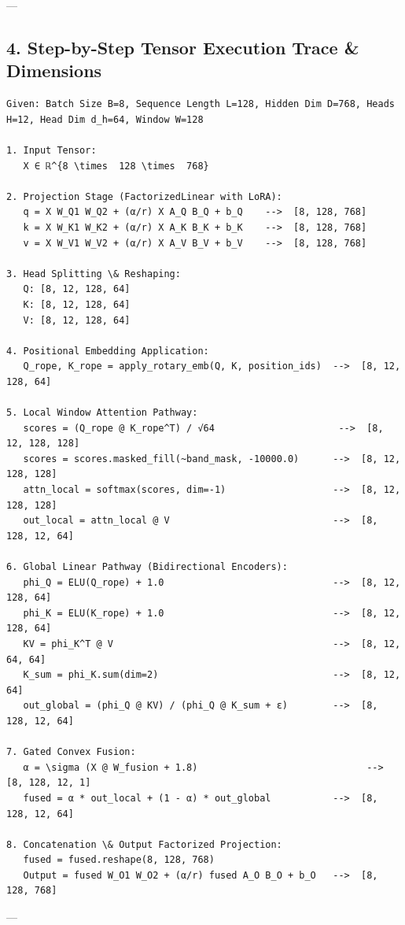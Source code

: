 ---



\subsection{4. Step-by-Step Tensor Execution Trace \& Dimensions}

\begin{lstlisting}
Given: Batch Size B=8, Sequence Length L=128, Hidden Dim D=768, Heads H=12, Head Dim d_h=64, Window W=128

1. Input Tensor:
   X ∈ ℝ^{8 \times  128 \times  768}

2. Projection Stage (FactorizedLinear with LoRA):
   q = X W_Q1 W_Q2 + (α/r) X A_Q B_Q + b_Q    -->  [8, 128, 768]
   k = X W_K1 W_K2 + (α/r) X A_K B_K + b_K    -->  [8, 128, 768]
   v = X W_V1 W_V2 + (α/r) X A_V B_V + b_V    -->  [8, 128, 768]

3. Head Splitting \& Reshaping:
   Q: [8, 12, 128, 64]
   K: [8, 12, 128, 64]
   V: [8, 12, 128, 64]

4. Positional Embedding Application:
   Q_rope, K_rope = apply_rotary_emb(Q, K, position_ids)  -->  [8, 12, 128, 64]

5. Local Window Attention Pathway:
   scores = (Q_rope @ K_rope^T) / √64                      -->  [8, 12, 128, 128]
   scores = scores.masked_fill(~band_mask, -10000.0)      -->  [8, 12, 128, 128]
   attn_local = softmax(scores, dim=-1)                   -->  [8, 12, 128, 128]
   out_local = attn_local @ V                             -->  [8, 128, 12, 64]

6. Global Linear Pathway (Bidirectional Encoders):
   phi_Q = ELU(Q_rope) + 1.0                              -->  [8, 12, 128, 64]
   phi_K = ELU(K_rope) + 1.0                              -->  [8, 12, 128, 64]
   KV = phi_K^T @ V                                       -->  [8, 12, 64, 64]
   K_sum = phi_K.sum(dim=2)                               -->  [8, 12, 64]
   out_global = (phi_Q @ KV) / (phi_Q @ K_sum + ε)        -->  [8, 128, 12, 64]

7. Gated Convex Fusion:
   α = \sigma (X @ W_fusion + 1.8)                              -->  [8, 128, 12, 1]
   fused = α * out_local + (1 - α) * out_global           -->  [8, 128, 12, 64]

8. Concatenation \& Output Factorized Projection:
   fused = fused.reshape(8, 128, 768)
   Output = fused W_O1 W_O2 + (α/r) fused A_O B_O + b_O   -->  [8, 128, 768]
\end{lstlisting}


---